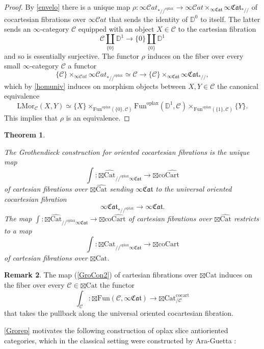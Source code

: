 \documentclass[10pt,oneside]{article}
\numberwithin{equation}{section} %
\numberwithin{figure}{section} %
\theoremstyle{plain}
\newtheorem{theorem}{Theorem}[subsection]
\theoremstyle{definition}
\newtheorem{remark}[theorem]{Remark}
\newcommand{\bD}{{\mathbb D}}
\newcommand{\mC}{{\mathcal C}}
\renewcommand{\L}{{\mathrm L}}
\newcommand{\co}{\mathrm{co}}
\newcommand{\Cat}{\mathrm{Cat}}
\newcommand{\Fun}{\mathrm{Fun}}
\newcommand{\cocart}{{\mathrm{cocart}}}
\newcommand{\coCart}{{\mathrm{coCart}}}
\newcommand{\Cart}{{\mathrm{Cart}}}
\newcommand{\oplax}{{\mathrm{oplax}}}
\newcommand{\Mor}{{\mathrm{Mor}}}
\newcommand{\scat}{\mathcal{C}\mathit{at}}
\newcommand{\fcat}{\mathfrak{Cat}}
\begin{document}
\begin{proof}
By \cref{envelo} there is a unique map $\rho: \infty\scat_{*//^\oplax} \to \infty\scat \times_{\infty\fcat} \infty\fcat_{*//} $ of cocartesian fibrations
over $\infty\scat$ that sends the identity of $\bD^0$ to
itself. The latter sends an $\infty$-category $\mC$ equipped with an object $X \in \mC$ to the cartesian fibration 
$$ \mC \coprod_{\{0\} } \bD^1 \to \{0\} \coprod_{\{0\}} \bD^1 $$
and so is essentially surjective.
The functor $\rho$ induces on the fiber over every small $\infty$-category $\mC$ a functor 
$$\{\mC\} \times_{\infty\scat} \infty\scat_{*//^\oplax} \simeq \mC \to \{\mC\} \times_{\infty\fcat} \infty\fcat_{*//},$$
which by \cref{homuniv} induces on morphism objects between $X,Y \in \mC$
the canonical equivalence $$ \L\Mor_\mC(X,Y) \simeq \{X\} \times_{\Fun^\oplax(\{0\},\mC)} \Fun^\oplax(\bD^1,\mC) \times_{\Fun^\oplax(\{1\},\mC)} \{Y\}.$$
This implies that $\rho$ is an equivalence.    
\end{proof}



\begin{theorem}\label{T7}

The Grothendieck construction for oriented cocartesian fibrations is the unique map 
$$\int: {\boxtimes\widehat{\Cat}}_{//^\oplax\infty\fcat} \to {\boxtimes\co\widehat{\Cart}}$$
of cartesian fibrations over $\boxtimes\widehat{\Cat}$ sending $\infty\fcat$ to the universal oriented cocartesian fibration $$ \infty\fcat_{*//^\oplax} \to \infty\fcat.$$
The map $\int: {\boxtimes\widehat{\Cat}}_{//^\oplax\infty\fcat} \to {\boxtimes\co\widehat{\Cart}}$ of cartesian fibrations over
$\boxtimes\widehat{\Cat}$
restricts to a map 
\begin{equation}\label{GroCon2}
\int: {\boxtimes\Cat}_{//^\oplax\infty\fcat} \to {\boxtimes\coCart}
\end{equation} of cartesian fibrations over $\boxtimes\Cat$.

\end{theorem}

\begin{remark}

The map (\ref{GroCon2}) of cartesian fibrations over $\boxtimes\Cat$
induces on the fiber over every $\mC \in \boxtimes\Cat$ the functor
$$\int_\mC : {\boxtimes\Fun}(\mC, \infty\fcat) \to \boxtimes\Cat^\cocart_{/\mC}$$
that takes the pullback along the universal oriented cocartesian fibration.
    
\end{remark}

\cref{Grorep} motivates the following construction of oplax slice antioriented categories, which in the classical setting were constructed by Ara-Guetta \cite{ARA2026110762}:
\end{document}
